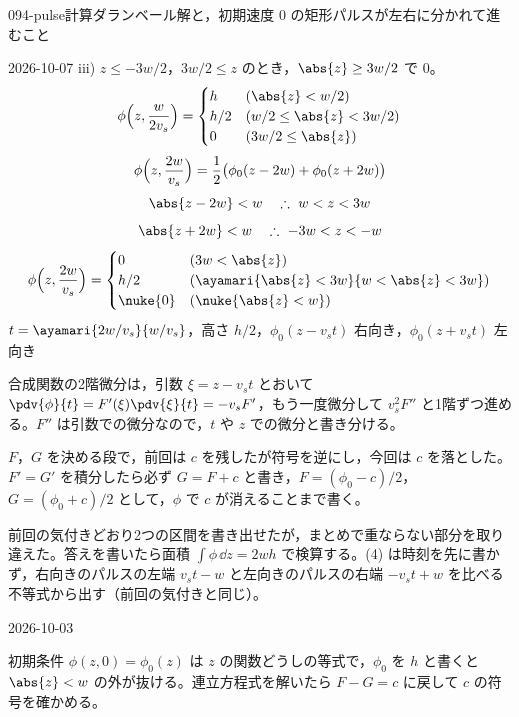 \documentclass[uplatex,dvipdfmx,a4paper,11pt]{jsarticle}
\begin{document}
\begin{mondai}{094-pulse}{計算}{ダランベール解と，初期速度 0 の矩形パルスが左右に分かれて進むこと}
\begin{kotaeutsushi}{2026-10-07}
iii) $z\le-3w/2$，$3w/2\le z$ のとき，$\abs{z}\ge3w/2$ で $0$。
\[ \phi\Bigl(z,\frac{w}{2v_s}\Bigr)=\begin{cases}h&(\abs{z}<w/2)\\ h/2&(w/2\le\abs{z}<3w/2)\\ 0&(3w/2\le\abs{z})\end{cases} \]
\[ \phi\Bigl(z,\frac{2w}{v_s}\Bigr)=\frac{1}{2}\bigl(\phi_0(z-2w)+\phi_0(z+2w)\bigr) \]
\[ \abs{z-2w}<w\quad\therefore\ w<z<3w \]
\[ \abs{z+2w}<w\quad\therefore\ -3w<z<-w \]
\[ \phi\Bigl(z,\frac{2w}{v_s}\Bigr)=\begin{cases}0&(3w<\abs{z})\\ h/2&(\ayamari{\abs{z}<3w}{w<\abs{z}<3w})\\ \nuke{0}&(\nuke{\abs{z}<w})\end{cases} \]
$t=\ayamari{2w/v_s}{w/v_s}$，高さ $h/2$，$\phi_0(z-v_st)$ 右向き，$\phi_0(z+v_st)$ 左向き
\end{kotaeutsushi}
\begin{kizuki}
\item 合成関数の2階微分は，引数 $\xi=z-v_st$ とおいて $\pdv{\phi}{t}=F'(\xi)\pdv{\xi}{t}=-v_sF'$，もう一度微分して $v_s^{2}F''$ と1階ずつ進める。$F''$ は引数での微分なので，$t$ や $z$ での微分と書き分ける。
\item {} $F$，$G$ を決める段で，前回は $c$ を残したが符号を逆にし，今回は $c$ を落とした。$F'=G'$ を積分したら必ず $G=F+c$ と書き，$F=(\phi_0-c)/2$，$G=(\phi_0+c)/2$ として，$\phi$ で $c$ が消えることまで書く。
\item {} 前回の気付きどおり2つの区間を書き出せたが，まとめで重ならない部分を取り違えた。答えを書いたら面積 $\int\phi\,\dd z=2wh$ で検算する。(4) は時刻を先に書かず，右向きのパルスの左端 $v_st-w$ と左向きのパルスの右端 $-v_st+w$ を比べる不等式から出す（前回の気付きと同じ）。
\end{kizuki}
\begin{maekizuki}{2026-10-03}
\item 初期条件 $\phi(z,0)=\phi_0(z)$ は $z$ の関数どうしの等式で，$\phi_0$ を $h$ と書くと $\abs{z}<w$ の外が抜ける。連立方程式を解いたら $F-G=c$ に戻して $c$ の符号を確かめる。

\end{maekizuki}
\end{mondai}
\end{document}
